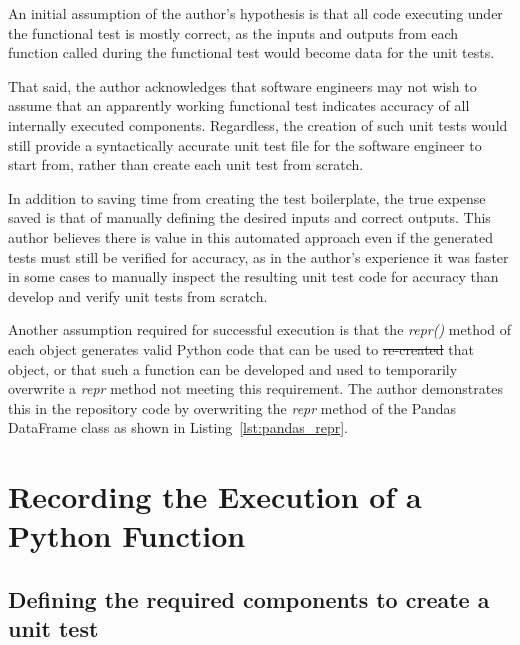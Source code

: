 \documentclass[10pt, conference]{IEEEtran}
\makeatletter
\providecommand{\DIFadd}[1]{{\protect\color{blue}\uwave{#1}}} %
\providecommand{\DIFdel}[1]{{\protect\color{red}\sout{#1}}} %
\providecommand{\DIFaddbegin}{} %
\providecommand{\DIFaddend}{} %
\providecommand{\DIFdelbegin}{} %
\providecommand{\DIFdelend}{} %
\newcommand{\DIFscaledelfig}{0.5}
\newlength{\DIFdelgraphicswidth} %
\newlength{\DIFdelgraphicsheight} %
\newcommand{\DIFaddincludegraphics}[2][]{{\color{blue}\fbox{\DIFOincludegraphics[#1]{#2}}}} %
\newcommand{\DIFdelincludegraphics}[2][]{%
\sbox{\DIFdelgraphicsbox}{\DIFOincludegraphics[#1]{#2}}%
\settoboxwidth{\DIFdelgraphicswidth}{\DIFdelgraphicsbox} %
\settoboxtotalheight{\DIFdelgraphicsheight}{\DIFdelgraphicsbox} %
\scalebox{\DIFscaledelfig}{%
\parbox[b]{\DIFdelgraphicswidth}{\usebox{\DIFdelgraphicsbox}\\[-\baselineskip] \rule{\DIFdelgraphicswidth}{0em}}\llap{\resizebox{\DIFdelgraphicswidth}{\DIFdelgraphicsheight}{%
\setlength{\unitlength}{\DIFdelgraphicswidth}%
\begin{picture}(1,1)%
\thicklines\linethickness{2pt} %
{\color[rgb]{1,0,0}\put(0,0){\framebox(1,1){}}}%
{\color[rgb]{1,0,0}\put(0,0){\line( 1,1){1}}}%
{\color[rgb]{1,0,0}\put(0,1){\line(1,-1){1}}}%
\end{picture}%
}\hspace*{3pt}}} %
} %
\DeclareRobustCommand{\DIFaddbegin}{\DIFOaddbegin \let\includegraphics\DIFaddincludegraphics} %
\DeclareRobustCommand{\DIFaddend}{\DIFOaddend \let\includegraphics\DIFOincludegraphics} %
\DeclareRobustCommand{\DIFdelbegin}{\DIFOdelbegin \let\includegraphics\DIFdelincludegraphics} %
\DeclareRobustCommand{\DIFdelend}{\DIFOaddend \let\includegraphics\DIFOincludegraphics} %
\let\sout@orig\sout %
\renewcommand{\sout}[1]{\ifmmode\text{\sout@orig{\ensuremath{#1}}}\else\sout@orig{#1}\fi} %
\makeatother
\begin{document}
An initial assumption of the author's hypothesis is that all code executing under the
functional test is mostly correct, as the inputs and outputs from each
function called during the functional test would become data for the
unit tests.  

That said, the author acknowledges that software engineers may not 
wish to assume that an apparently working functional test indicates accuracy of 
all internally executed components. Regardless, the creation of such unit 
tests would still provide a syntactically accurate unit
test file for the software engineer to start from, rather than create each unit
test from scratch.  

In addition to saving time from creating the test
boilerplate, the true expense saved is that of manually defining the desired
inputs and correct outputs.  This author believes there is value in this automated
approach even if the generated tests must still be verified for accuracy,
as in the author's experience it was faster in some cases to manually inspect 
the resulting unit test code for accuracy than develop and verify unit tests from scratch.

Another assumption required for successful execution is that the \textit{repr()} method
of each object generates valid Python code that can be used to \DIFdelbegin \DIFdel{re-created }\DIFdelend \DIFaddbegin \DIFadd{re-create }\DIFaddend that
object, or that such a function can be developed and used to temporarily
overwrite a \textit{repr\(\)} method not meeting this requirement.  The author demonstrates
this in the repository code by overwriting the \textit{repr\(\)} method of the
Pandas DataFrame class as shown in Listing~\ref{lst:pandas_repr}.

\DIFdelbegin %
\DIFdelend \DIFaddbegin 
 \DIFaddend \section{Recording the Execution of a Python Function}\label{sec:approach}

\subsection{Defining the required components to create a unit test}\label{sec:intro-1}
\end{document}
